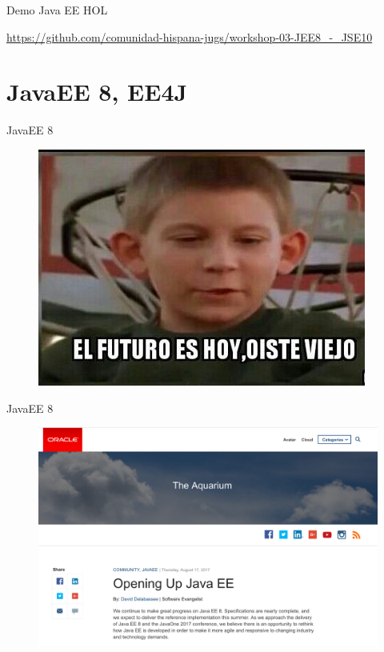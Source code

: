 \documentclass{beamer}
\begin{document}
\begin{frame}{Demo}
Java EE HOL

\url{https://github.com/comunidad-hispana-jugs/workshop-03-JEE8_-_JSE10}

\end{frame}




\section{JavaEE 8, EE4J}

\begin{frame}{JavaEE 8}
\begin{figure}
	\centering
	\includegraphics[width=0.6\linewidth]{Images/futuro}
\end{figure}
\end{frame}

\begin{frame}{JavaEE 8}
\begin{figure}
	\centering
	\includegraphics[width=\linewidth]{Images/javaeeopen}
\end{figure}
\end{frame}
\end{document}
